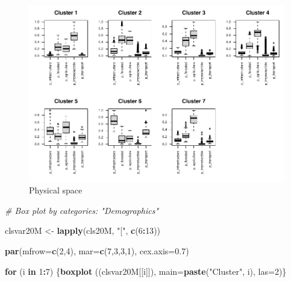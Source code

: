 \documentclass[
]{book}
\newenvironment{Shaded}{\begin{snugshade}}{\end{snugshade}}
\newcommand{\AttributeTok}[1]{\textcolor[rgb]{0.13,0.29,0.53}{#1}}
\newcommand{\CommentTok}[1]{\textcolor[rgb]{0.56,0.35,0.01}{\textit{#1}}}
\newcommand{\ControlFlowTok}[1]{\textcolor[rgb]{0.13,0.29,0.53}{\textbf{#1}}}
\newcommand{\DecValTok}[1]{\textcolor[rgb]{0.00,0.00,0.81}{#1}}
\newcommand{\FloatTok}[1]{\textcolor[rgb]{0.00,0.00,0.81}{#1}}
\newcommand{\FunctionTok}[1]{\textcolor[rgb]{0.13,0.29,0.53}{\textbf{#1}}}
\newcommand{\NormalTok}[1]{#1}
\newcommand{\OtherTok}[1]{\textcolor[rgb]{0.56,0.35,0.01}{#1}}
\newcommand{\SpecialCharTok}[1]{\textcolor[rgb]{0.81,0.36,0.00}{\textbf{#1}}}
\newcommand{\StringTok}[1]{\textcolor[rgb]{0.31,0.60,0.02}{#1}}
\begin{document}
\begin{figure}
\centering
\includegraphics{05-SOM_files/figure-latex/boxplot-clsM-PhisicalSpace-1.pdf}
\caption{\label{fig:boxplot-clsM-PhisicalSpace}Physical space}
\end{figure}

\begin{Shaded}
\begin{Highlighting}[]
\CommentTok{\# Box plot by categories: "Demographics"}

\NormalTok{clsvar20M }\OtherTok{\textless{}{-}} \FunctionTok{lapply}\NormalTok{(cls20M, }\StringTok{"["}\NormalTok{, }\FunctionTok{c}\NormalTok{(}\DecValTok{6}\SpecialCharTok{:}\DecValTok{13}\NormalTok{)) }

\FunctionTok{par}\NormalTok{(}\AttributeTok{mfrow=}\FunctionTok{c}\NormalTok{(}\DecValTok{2}\NormalTok{,}\DecValTok{4}\NormalTok{), }\AttributeTok{mar=}\FunctionTok{c}\NormalTok{(}\DecValTok{7}\NormalTok{,}\DecValTok{3}\NormalTok{,}\DecValTok{3}\NormalTok{,}\DecValTok{1}\NormalTok{), }\AttributeTok{cex.axis=}\FloatTok{0.7}\NormalTok{)}

\ControlFlowTok{for}\NormalTok{ (i }\ControlFlowTok{in} \DecValTok{1}\SpecialCharTok{:}\DecValTok{7}\NormalTok{) \{}\FunctionTok{boxplot}\NormalTok{ ((clsvar20M[[i]]), }\AttributeTok{main=}\FunctionTok{paste}\NormalTok{(}\StringTok{"Cluster"}\NormalTok{, i),  }\AttributeTok{las=}\DecValTok{2}\NormalTok{)\}}
\end{Highlighting}
\end{Shaded}
\end{document}
